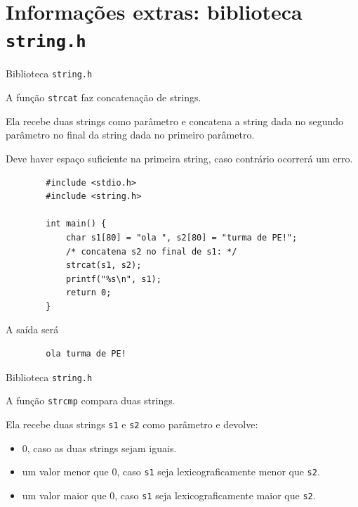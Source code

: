 \documentclass[handout]{beamer}
\newcommand{\cod}[1]{\texttt{#1}}
\begin{document}

\section{Informações extras: biblioteca \texttt{string.h}}

\begin{frame}[fragile]{Biblioteca \texttt{string.h}}

    A função \cod{strcat} faz concatenação de strings.

    Ela recebe duas strings como parâmetro e concatena a string dada no segundo parâmetro no final da string dada no primeiro parâmetro.

    Deve haver espaço suficiente na primeira string, caso contrário ocorrerá um erro.

    \begin{verbatim}
        #include <stdio.h>
        #include <string.h>

        int main() {
            char s1[80] = "ola ", s2[80] = "turma de PE!";
            /* concatena s2 no final de s1: */
            strcat(s1, s2);
            printf("%s\n", s1);
            return 0;
        }
    \end{verbatim}

    A saída será
    \begin{verbatim}
        ola turma de PE!
    \end{verbatim}

\end{frame}

\begin{frame}[fragile]{Biblioteca \texttt{string.h}}

    A função \cod{strcmp} compara duas strings. 
    
    Ela recebe duas strings \cod{s1} e \cod{s2} como parâmetro e devolve:
    \begin{itemize}
        \item 0, caso as duas strings sejam iguais.
        \item um valor menor que 0, caso \cod{s1} seja lexicograficamente menor que \cod{s2}.
        \item um valor maior que 0, caso \cod{s1} seja lexicograficamente maior que \cod{s2}.
    \end{itemize}

\end{frame}
\end{document}

